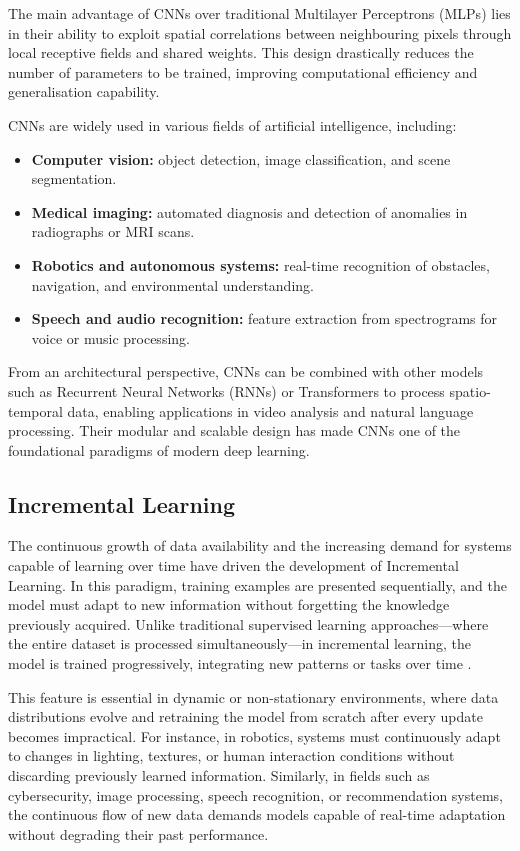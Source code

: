 The main advantage of CNNs over traditional Multilayer Perceptrons (MLPs) lies in their ability to exploit spatial correlations between neighbouring pixels through local receptive fields and shared weights.  
This design drastically reduces the number of parameters to be trained, improving computational efficiency and generalisation capability.

CNNs are widely used in various fields of artificial intelligence, including:

\begin{itemize}
    \item \textbf{Computer vision:} object detection, image classification, and scene segmentation.
    \item \textbf{Medical imaging:} automated diagnosis and detection of anomalies in radiographs or MRI scans.
    \item \textbf{Robotics and autonomous systems:} real-time recognition of obstacles, navigation, and environmental understanding.
    \item \textbf{Speech and audio recognition:} feature extraction from spectrograms for voice or music processing.
\end{itemize}

From an architectural perspective, CNNs can be combined with other models such as Recurrent Neural Networks (RNNs) or Transformers to process spatio-temporal data, enabling applications in video analysis and natural language processing.  
Their modular and scalable design has made CNNs one of the foundational paradigms of modern deep learning.

\subsection{Incremental Learning}

The continuous growth of data availability and the increasing demand for systems capable of learning over time have driven the development of Incremental Learning.  
In this paradigm, training examples are presented sequentially, and the model must adapt to new information without forgetting the knowledge previously acquired.  
Unlike traditional supervised learning approaches—where the entire dataset is processed simultaneously—in incremental learning, the model is trained progressively, integrating new patterns or tasks over time \cite{GiraudCarrier2000}.

This feature is essential in dynamic or non-stationary environments, where data distributions evolve and retraining the model from scratch after every update becomes impractical.  
For instance, in robotics, systems must continuously adapt to changes in lighting, textures, or human interaction conditions without discarding previously learned information.  
Similarly, in fields such as cybersecurity, image processing, speech recognition, or recommendation systems, the continuous flow of new data demands models capable of real-time adaptation without degrading their past performance.

